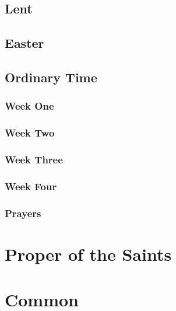 \documentclass[12pt,twoside,a5paper]{memoir}
\begin{document}
\chapter*[Lent]{Lent}
\clearpage

\chapter*[Easter]{Easter}
\clearpage

%
\chapter*[Ordinary Time]{Ordinary Time}
\clearpage

\section*{Week One}
\section*{Week Two}
\section*{Week Three}
\section*{Week Four}
\section*{Prayers}
\part*{Proper of the Saints}
\part*{Common}
\end{document}

